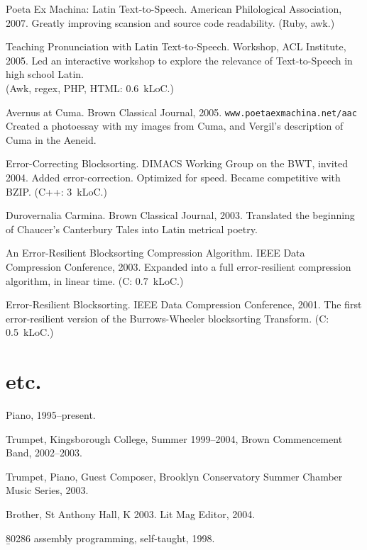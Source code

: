 \documentclass[11pt]{article}
\begin{document}
\p Poeta Ex Machina: Latin Text-to-Speech.  American Philological Association, 2007.
Greatly improving scansion and source code readability.  (Ruby, awk.)



\p Teaching Pronunciation with Latin Text-to-Speech.  Workshop, ACL Institute, 2005.
Led an interactive workshop to explore the relevance of Text-to-Speech in high school Latin.\\(Awk, regex, PHP, HTML: 0.6~kLoC.)

\p Avernus at Cuma.  Brown Classical Journal, 2005.  \texttt{www.poetaexmachina.net/aac}
Created a photoessay with my images from Cuma, and Vergil's description of Cuma in the Aeneid.

\p Error-Correcting Blocksorting.  DIMACS Working Group on the BWT, invited 2004.
Added error-correction.  Optimized for speed.  Became competitive with BZIP.  (C++: 3~kLoC.)

\p Durovernalia Carmina. Brown Classical Journal, 2003.
Translated the beginning of Chaucer's Canterbury Tales into Latin metrical poetry.

\p An Error-Resilient Blocksorting Compression Algorithm.  IEEE Data Compression Conference, 2003.
Expanded into a full error-resilient compression algorithm, in linear time. (C: 0.7~kLoC.)

\p Error-Resilient Blocksorting.  IEEE Data Compression Conference, 2001.
The first error-resilient version of the Burrows-Wheeler blocksorting Transform. (C: 0.5~kLoC.)

\part{etc.}%
\noindent Piano, 1995--present.

\noindent Trumpet, Kingsborough College, Summer 1999--2004, Brown Commencement Band, 2002--2003.

\noindent Trumpet, Piano, Guest Composer, Brooklyn Conservatory Summer Chamber Music Series, 2003.

\noindent Brother, St Anthony Hall, K 2003.  Lit Mag Editor, 2004.

\noindent\b{80286 assembly programming, self-taught, 1998.}
\end{document}
